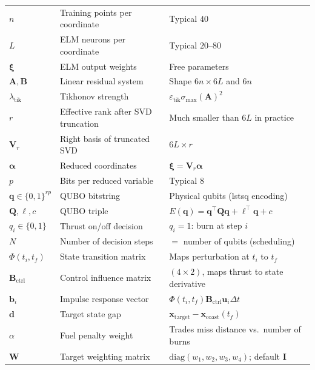 \documentclass[8pt,a4paper]{article}
\newcommand{\bvec}[1]{\bm{#1}}
\newcommand{\xvec}{\bvec{x}}
\newcommand{\uvec}{\bvec{u}}
\newcommand{\Amat}{\bvec{A}}
\newcommand{\Bmat}{\bvec{B}}
\newcommand{\Qmat}{\bvec{Q}}
\newcommand{\Vr}{\bvec{V}_r}
\theoremstyle{definition}
\theoremstyle{remark}
\begin{document}
\begin{center}
\begin{tabular}{llp{7cm}}
  $n$ & Training points per coordinate & Typical $40$ \\
  $L$ & ELM neurons per coordinate & Typical $20$--$80$ \\
  $\bm\xi$ & ELM output weights & Free parameters \\
  \midrule
  $\Amat, \Bmat$ & Linear residual system & Shape $6n \times 6L$ and $6n$ \\
  $\lambda_{\mathrm{tik}}$ & Tikhonov strength & $\varepsilon_{\mathrm{tik}} \sigma_{\max}(\Amat)^2$ \\
  $r$ & Effective rank after SVD truncation & Much smaller than $6L$ in practice \\
  $\Vr$ & Right basis of truncated SVD & $6L \times r$ \\
  $\bm\alpha$ & Reduced coordinates & $\bm\xi = \Vr \bm\alpha$ \\
  $p$ & Bits per reduced variable & Typical $8$ \\
  $\bvec q \in \{0,1\}^{rp}$ & QUBO bitstring & Physical qubits (lstsq encoding) \\
  $\Qmat, \bvec\ell, c$ & QUBO triple & $E(\bvec q)=\bvec q^\top \Qmat \bvec q + \bvec\ell^\top \bvec q + c$ \\
  \midrule
  $q_i \in \{0,1\}$ & Thrust on/off decision & $q_i=1$: burn at step $i$ \\
  $N$ & Number of decision steps & $= $ number of qubits (scheduling) \\
  $\Phi(t_i, t_f)$ & State transition matrix & Maps perturbation at $t_i$ to $t_f$ \\
  $\bvec B_{\mathrm{ctrl}}$ & Control influence matrix & $(4\times 2)$, maps thrust to state derivative \\
  $\bvec b_i$ & Impulse response vector & $\Phi(t_i,t_f)\bvec B_{\mathrm{ctrl}} \uvec_i \Delta t$ \\
  $\bvec d$ & Target state gap & $\xvec_{\mathrm{target}} - \xvec_{\mathrm{coast}}(t_f)$ \\
  $\alpha$ & Fuel penalty weight & Trades miss distance vs.\ number of burns \\
  $\bvec W$ & Target weighting matrix & $\mathrm{diag}(w_1,w_2,w_3,w_4)$; default $\bvec I$ \\
  \bottomrule
\end{tabular}
\end{center}


\end{document}
